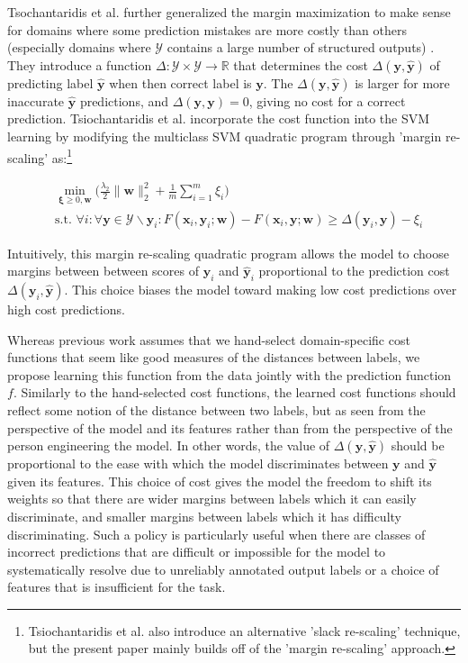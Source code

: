 \documentclass{article} %
\begin{document}
Tsochantaridis et al. further generalized the margin maximization
to make sense for domains where some prediction mistakes are more 
costly than others (especially domains where $\mathcal{Y}$ contains
a large number of structured outputs) \citep{tsochantaridis2004support}.  They introduce a function 
$\Delta:\mathcal{Y}\times\mathcal{Y}\rightarrow\mathbb{R}$ that
determines the cost
$\Delta(\mathbf{y},\mathbf{\hat{y}})$ of predicting label 
$\mathbf{\hat{y}}$ when then correct label is $\mathbf{y}$.  
The $\Delta(\mathbf{y},\mathbf{\hat{y}})$ is larger for more 
inaccurate $\mathbf{\hat{y}}$ predictions, and 
$\Delta(\mathbf{y},\mathbf{y})=0$, giving no cost for a correct
prediction. Tsiochantaridis et al. incorporate 
the cost function into the SVM learning by modifying the 
multiclass SVM quadratic
program through 'margin re-scaling' as:\footnote{Tsiochantaridis et al. 
also introduce an alternative 'slack re-scaling' technique, but the 
present paper mainly builds off of the 'margin re-scaling' approach.}

\begin{equation}
\label{marginRescaling}
\begin{split}
& \min_{\mathbf{\xi}\geq 0, \mathbf{w}}\big(\frac{\lambda_2}{2}\|\mathbf{w}\|_2^2+\frac{1}{m}\sum_{i=1}^m\xi_i\big) \\
& \text{s.t.     } \forall i : \forall \mathbf{y}\in\mathcal{Y}\backslash\mathbf{y}_i : F(\mathbf{x}_i,\mathbf{y}_i;\mathbf{w})-F(\mathbf{x}_i,\mathbf{y};\mathbf{w})\geq \Delta(\mathbf{y}_i,\mathbf{y})-\xi_i
\end{split}
\end{equation}

Intuitively, this margin re-scaling quadratic program allows 
the model to choose margins between between scores of 
$\mathbf{y}_i$ and $\mathbf{\hat{y}}_i$  proportional to
the prediction cost $\Delta(\mathbf{y}_i,\mathbf{\hat{y}})$.
This choice biases the model toward making low cost 
predictions over high cost predictions.

Whereas previous work assumes that we hand-select 
domain-specific cost functions that seem like 
good measures of the distances between labels, we
propose learning this function from the data jointly with
the prediction function $f$.  Similarly to the hand-selected
cost functions, the learned cost functions
should reflect some notion of the distance between two
labels, but as seen from the perspective of the model and its
features rather than from the perspective of the person 
engineering the model. In other words, the value of 
$\Delta(\mathbf{y}, \mathbf{\hat{y}})$ should
be proportional to the ease with which the model  
discriminates between $\mathbf{y}$ and $\mathbf{\hat{y}}$
given its features.  This choice of cost gives the model the
freedom to shift its weights so that there are wider margins
between labels which it can easily discriminate, and smaller
margins between labels which it has difficulty discriminating.
Such a policy is particularly useful when there are classes
of incorrect predictions that are difficult or impossible for 
the model to systematically resolve due to unreliably 
annotated output labels or a 
choice of features that is insufficient for the task.
\end{document}
